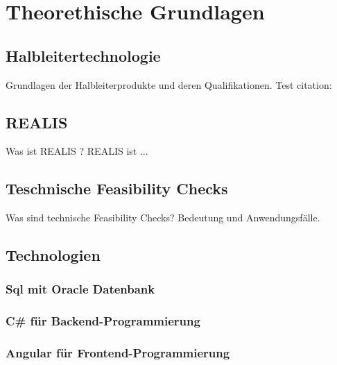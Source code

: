 \chapter{Theorethische Grundlagen}
\section{Halbleitertechnologie}
Grundlagen der Halbleiterprodukte und deren Qualifikationen. Test citation: \cite{lienig2023halbleitertechnologie}

\section{REALIS}

Was ist \ac{REALIS} ? \ac{REALIS} ist ...

\section{Teschnische Feasibility Checks}
Was sind technische Feasibility Checks? Bedeutung und Anwendungsfälle.

\section{Technologien}

\subsection{Sql mit Oracle Datenbank}

\subsection{C\# für Backend-Programmierung}

\subsection{Angular für Frontend-Programmierung}